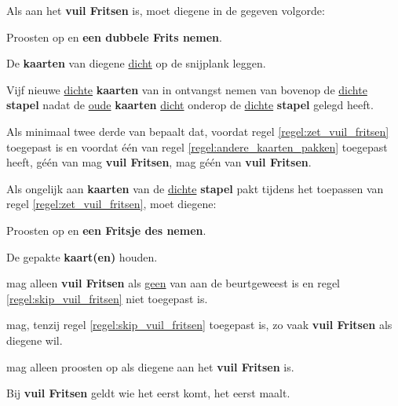 \vervolgLijst{}
\item Als \eenSpeler aan het \textbf{vuil Fritsen} is, moet diegene in de gegeven volgorde:
\puntLijst{}
\item Proosten op  en \textbf{een dubbele Frits nemen}\footnotemark[3].
\item De \textbf{kaarten} van diegene \ul{dicht} op de snijplank leggen.
\item Vijf nieuwe \ul{dichte} \textbf{kaarten} van \Frits in ontvangst nemen van bovenop de \ul{dichte} \textbf{stapel} nadat \Frits de \ul{oude} \textbf{kaarten} \ul{dicht} onderop de \ul{dichte} \textbf{stapel} gelegd heeft.
\eindPuntLijst{}
\label{regel:zet_vuil_fritsen}
\eindLijst{}

\vervolgLijst{}
\item Als minimaal twee derde van \alleSpelers bepaalt dat, voordat regel \ref{regel:zet_vuil_fritsen} toegepast is en voordat \'e\'en van \alleSpelers regel \ref{regel:andere_kaarten_pakken} toegepast heeft, géén van \alleSpelers mag \textbf{vuil Fritsen}, mag géén van \alleSpelers \textbf{vuil Fritsen}.
\label{regel:skip_vuil_fritsen}
\eindLijst{}

\vervolgLijst{}
\item Als \eenSpeler ongelijk aan \Frits \textbf{kaarten} van de \ul{dichte} \textbf{stapel} pakt tijdens het toepassen van regel \ref{regel:zet_vuil_fritsen}, moet diegene:
\puntLijst{}
\item Proosten op  en \textbf{een Fritsje des nemen}\footnotemark[4].
\item De gepakte \textbf{kaart(en)} houden.
\eindPuntLijst{}
\eindLijst{}

\vervolgLijst{}
\item \EenSpeler mag alleen \textbf{vuil Fritsen} als \ul{geen} van \alleSpelers aan de beurt\footnotemark[1] geweest is en regel \ref{regel:skip_vuil_fritsen} niet toegepast is.
\eindLijst{}

\vervolgLijst{}
\item \EenSpeler mag, tenzij regel \ref{regel:skip_vuil_fritsen} toegepast is, zo vaak \textbf{vuil Fritsen} als diegene wil.
\eindLijst{}

\vervolgLijst{}
\item \EenSpeler mag alleen proosten op  als diegene aan het \textbf{vuil Fritsen} is.
\eindLijst{}

\vervolgLijst{}
\item Bij \textbf{vuil Fritsen} geldt wie het eerst komt, het eerst maalt.
\eindLijst{}

